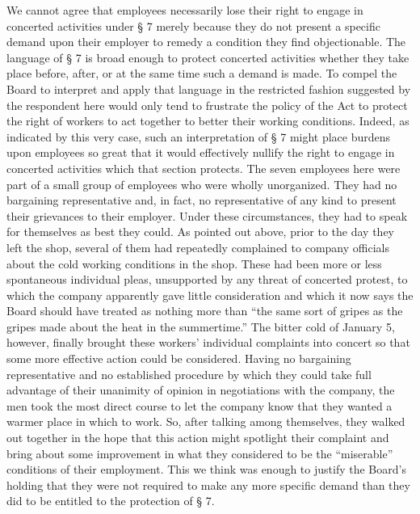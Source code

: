 \documentclass[
  letterpaper,
  11pt,
  DIV=9,
  openright]{scrbook}
\begin{document}
We cannot agree that employees necessarily lose their right to engage in
concerted activities under § 7 merely because they do not present a
specific demand upon their employer to remedy a condition they find
objectionable. The language of § 7 is broad enough to protect concerted
activities whether they take place before, after, or at the same time
such a demand is made. To compel the Board to interpret and apply that
language in the restricted fashion suggested by the respondent here
would only tend to frustrate the policy of the Act to protect the right
of workers to act together to better their working conditions. Indeed,
as indicated by this very case, such an interpretation of § 7 might
place burdens upon employees so great that it would effectively nullify
the right to engage in concerted activities which that section protects.
The seven employees here were part of a small group of employees who
were wholly unorganized. They had no bargaining representative and, in
fact, no representative of any kind to present their grievances to their
employer. Under these circumstances, they had to speak for themselves as
best they could. As pointed out above, prior to the day they left the
shop, several of them had repeatedly complained to company officials
about the cold working conditions in the shop. These had been more or
less spontaneous individual pleas, unsupported by any threat of
concerted protest, to which the company apparently gave little
consideration and which it now says the Board should have treated as
nothing more than ``the same sort of gripes as the gripes made about the
heat in the summertime.'' The bitter cold of January 5, however, finally
brought these workers' individual complaints into concert so that some
more effective action could be considered. Having no bargaining
representative and no established procedure by which they could take
full advantage of their unanimity of opinion in negotiations with the
company, the men took the most direct course to let the company know
that they wanted a warmer place in which to work. So, after talking
among themselves, they walked out together in the hope that this action
might spotlight their complaint and bring about some improvement in what
they considered to be the ``miserable'' conditions of their employment.
This we think was enough to justify the Board's holding that they were
not required to make any more specific demand than they did to be
entitled to the protection of § 7.
\end{document}

